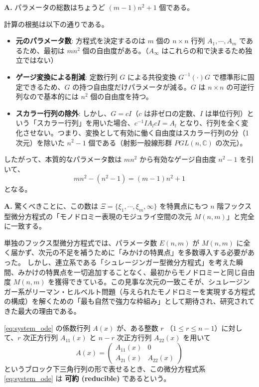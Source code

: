 \begin{Q}
\textbf{A.} パラメータの総数はちょうど $(m-1)n^{2}+1$ 個である。

計算の根拠は以下の通りである。
\begin{itemize}
    \item \textbf{元のパラメータ数}: 方程式を決定するのは $m$ 個の $n \times n$ 行列 $A_{1}, \cdots, A_{m}$ であるため、最初は $mn^{2}$ 個の自由度がある。（$A_{\infty}$ はこれらの和で決まるため独立ではない）
    \item \textbf{ゲージ変換による削減}: 定数行列 $G$ による共役変換 $G^{-1}(\cdot)G$ で標準形に固定できるため、$G$ の持つ自由度だけパラメータが減る。$G$ は $n \times n$ の可逆行列なので基本的には $n^{2}$ 個の自由度を持つ。
    \item \textbf{スカラー行列の除外}: しかし、$G = cI$（$c$ は非ゼロの定数、$I$ は単位行列）という「スカラー行列」を用いた場合、$c^{-1}I A_l cI = A_l$ となり、行列を全く変化させない。つまり、変換として有効に働く自由度はスカラー行列の分（1次元）を除いた $n^{2}-1$ 個である（射影一般線形群 $PGL(n, \mathbb{C})$ の次元）。
\end{itemize}
したがって、本質的なパラメータ数は $mn^{2}$ から有効なゲージ自由度 $n^{2}-1$ を引いて、
\[
mn^{2} - (n^{2} - 1) = (m-1)n^{2} + 1
\]
となる。
\end{Q}

\begin{Q}
\textbf{A.} 驚くべきことに、この数は $\Xi=\{\xi_{1},\cdots,\xi_{m},\infty\}$ を特異点にもつ $n$ 階フックス型微分方程式の「モノドロミー表現のモジュライ空間の次元 $M(n,m)$」と完全に一致する。

単独のフックス型微分方程式では、パラメータ数 $E(n,m)$ が $M(n,m)$ に全く届かず、次元の不足を補うために「みかけの特異点」を多数導入する必要があった。
しかし、連立系である「シュレージンガー型微分方程式」を考えた瞬間、みかけの特異点を一切追加することなく、最初からモノドロミーと同じ自由度 $M(n,m)$ を獲得できている。この見事な次元の一致こそが、シュレージンガー系がリーマン・ヒルベルト問題（与えられたモノドロミーを実現する方程式の構成）を解くための「最も自然で強力な枠組み」として期待され、研究されてきた最大の理由である。
\end{Q}
\begin{definition}[可約な系]
    \eqref{eq:system_ode} の係数行列 $A(x)$ が、ある整数 $r$ （$1 \le r \le n-1$）に対して、$r$ 次正方行列 $A_{11}(x)$ と $n-r$ 次正方行列 $A_{22}(x)$ を用いて
    \[
    A(x)=
    \begin{pmatrix}
    A_{11}(x) & 0\\
    A_{21}(x) & A_{22}(x)
    \end{pmatrix}
    \]
    というブロック下三角行列の形で表せるとき、この微分方程式系 \eqref{eq:system_ode} は \textbf{可約 (reducible)} であるという。
\end{definition}

